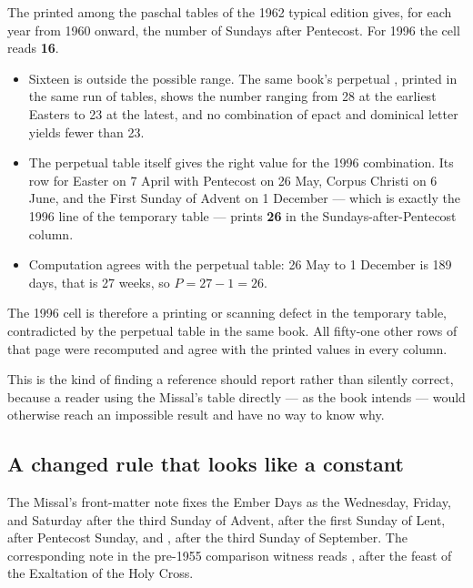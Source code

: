 The  printed among the paschal tables of the 1962
typical edition gives, for each year from 1960 onward, the number of Sundays after Pentecost. For
1996 the cell reads \textbf{16}.

\begin{itemize}[leftmargin=1.3em, itemsep=0.25em]
\item Sixteen is outside the possible range. The same book's perpetual , printed in the same run of tables, shows the number ranging from 28 at the
earliest Easters to 23 at the latest, and no combination of epact and dominical letter yields
fewer than 23.
\item The perpetual table itself gives the right value for the 1996 combination. Its row for
Easter on 7 April with Pentecost on 26 May, Corpus Christi on 6 June, and the First Sunday of
Advent on 1 December — which is exactly the 1996 line of the temporary table — prints
\textbf{26} in the Sundays-after-Pentecost column.
\item Computation agrees with the perpetual table: 26 May to 1 December is 189 days, that is
27 weeks, so $P = 27 - 1 = 26$.
\end{itemize}

The 1996 cell is therefore a printing or scanning defect in the temporary table, contradicted by
the perpetual table in the same book. All fifty-one other rows of that page
were recomputed and agree with the printed values in every column.

This is the kind of finding a reference should report rather than silently correct, because a
reader using the Missal's table directly — as the book intends — would otherwise reach an
impossible result and have no way to know why.

\subsection{A changed rule that looks like a constant}

The Missal's front-matter note  fixes the Ember Days as the
Wednesday, Friday, and Saturday after the third Sunday of Advent, after the first Sunday of Lent,
after Pentecost Sunday, and , after the third Sunday of
September. The corresponding note in the pre-1955 comparison witness reads , after the feast of the Exaltation of the Holy Cross.

